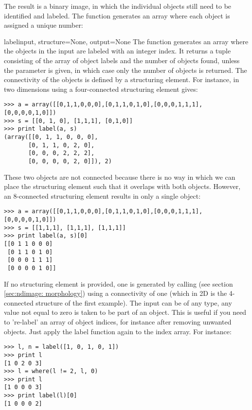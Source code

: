 The result is a binary image, in which the individual objects still need to 
be identified and labeled.  The function  generates an 
array where each object is assigned a unique number:

\begin{funcdesc}{label}{input, structure=None, output=None}
  The  function generates an array where the objects in the
  input are labeled with an integer index. It returns a tuple consisting of 
  the array of object labels and the number of objects found, unless the
   parameter is given, in which case only the number of objects 
  is returned. The connectivity of the objects is defined by a structuring
  element. For instance, in two dimensions using a four-connected 
  structuring element gives:
\begin{verbatim}
>>> a = array([[0,1,1,0,0,0],[0,1,1,0,1,0],[0,0,0,1,1,1],[0,0,0,0,1,0]])
>>> s = [[0, 1, 0], [1,1,1], [0,1,0]]
>>> print label(a, s)
(array([[0, 1, 1, 0, 0, 0],
       [0, 1, 1, 0, 2, 0],
       [0, 0, 0, 2, 2, 2],
       [0, 0, 0, 0, 2, 0]]), 2)
\end{verbatim}
These two objects are not connected because there is no way in which we can
place the structuring element such that it overlaps with both objects. 
However, an 8-connected structuring element results in only a single 
object:
\begin{verbatim}
>>> a = array([[0,1,1,0,0,0],[0,1,1,0,1,0],[0,0,0,1,1,1],[0,0,0,0,1,0]])
>>> s = [[1,1,1], [1,1,1], [1,1,1]]
>>> print label(a, s)[0]
[[0 1 1 0 0 0]
 [0 1 1 0 1 0]
 [0 0 0 1 1 1]
 [0 0 0 0 1 0]]
\end{verbatim}
If no structuring element is provided, one is generated by calling
 (see section \ref{sec:ndimage:
morphology}) using a connectivity of one (which in 2D is the 4-connected 
structure of the first example).  The input can be of any type, any value 
not equal to zero is taken to be part of an object. This is useful if you 
need to 're-label' an array of object indices, for instance after removing 
unwanted objects. Just apply the label function again to the index array. 
For instance:
\begin{verbatim}
>>> l, n = label([1, 0, 1, 0, 1])
>>> print l
[1 0 2 0 3]
>>> l = where(l != 2, l, 0)
>>> print l
[1 0 0 0 3]
>>> print label(l)[0]
[1 0 0 0 2]
\end{verbatim}

\end{funcdesc}

